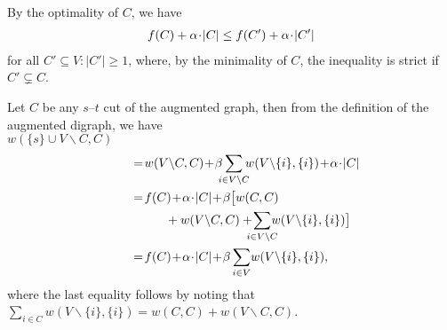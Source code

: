 \begin{Proof}
  
  
\end{Proof}


\begin{Proof}
  By the optimality of $C$, we have 
  \begin{align*}
    f(C) + \alpha \!\cdot\! |C| \leq f(C') + \alpha\!\cdot\! |C'|
  \end{align*}
  for all $C'\subseteq V:|C'|\geq 1$, where, by the minimality of $C$, the inequality is strict if
  $C'\subsetneq C$.
\end{Proof}


\begin{Proof}
  Let $C$ be any $s$--$t$ cut of the augmented graph,
	then from the definition of the augmented digraph, we have
	\\ $w(\{s\} \cup V\backslash C, C)$
	\begin{align}
		 \hspace*{0.8cm}& = \! w(V\backslash C,C)  \!+ \! \beta \!\! \! \sum_{i\in V\backslash C}  \!\!\! w(V\backslash \{i\},\{i\})  \! + \! \alpha\!
		 \cdot \! |C| 
		\\ &= \!
		f(C)  \!+ \! \alpha\! \cdot \! |C| \!+\! \beta \big[ w(C,C)  \notag
		\\& \hspace{1cm} +  w(V\backslash C,C) +  \! \! \!\! \sum_{i\in V\backslash C}  \! \!\!\! w(V\backslash \{i\},\{i\}) \big]
		\\ &=  \!
		f(C)  \!+ \! \alpha\! \cdot \! |C|  \!+ \! \beta \sum_{i\in V}   \!  w(V\backslash \{i\}, \{i\}),
	\end{align}
	where the last equality follows by noting that $\sum_{i\in C}w(V\backslash \{i\},\{i\}) = w(C,C) + w(V\backslash C, C)$.
\end{Proof}

